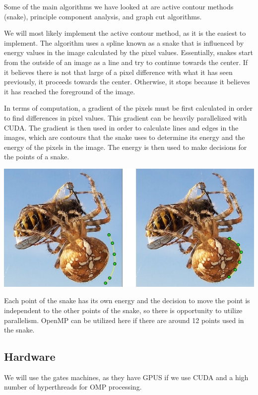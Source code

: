 \documentclass[12pt]{article}
\begin{document}
Some of the main algorithms we have looked at are active contour methods
(snake), principle component analysis, and graph cut algorithms.

We will most likely implement the active contour method, as it is the easiest
to implement. The algorithm uses a spline known as a snake that is influenced
by energy values in the image calculated by the pixel values. Essentially,
snakes start from the outside of an image as a line and try to continue towards
the center. If it believes there is not that large of a pixel difference with
what it has seen previously, it proceeds towards the center. Otherwise, it
stops because it believes it has reached the foreground of the image.

In terms of computation, a gradient of the pixels must be first calculated in
order to find differences in pixel values. This gradient can be heavily parallelized with
CUDA. The gradient is then used in order to calculate lines and edges in the
images, which are contours that the snake uses to determine its energy and
the energy of the pixels in the image. The energy is then used to make
decisions for the points of a snake.

\includegraphics{snake-contour-example.jpg}
\cite{contour-model}

Each point of the snake has its own energy and the decision to move the point
is independent to the other points of the snake, so there is opportunity to
utilize parallelism. OpenMP can be utilized here if there are around 12 points
used in the snake.

\subsection*{Hardware}
We will use the gates machines, as they have GPUS if we use CUDA and a high
number of hyperthreads for OMP processing.

\end{document}
